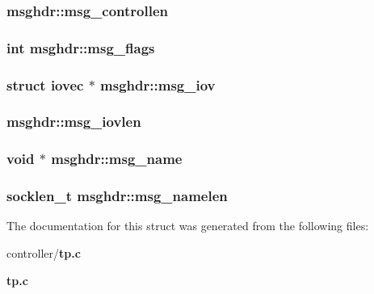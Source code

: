 \subsubsection[{msg\_\-controllen}]{ {\bf msghdr::msg\_\-controllen}}\label{structmsghdr_a9fa41b0e9a02b5dc9a01aa6f18108adb}
\subsubsection[{msg\_\-flags}]{\setlength{\rightskip}{0pt plus 5cm}int {\bf msghdr::msg\_\-flags}}\label{structmsghdr_a9e8ff97d402c99551cbfd564e9e10a74}
\subsubsection[{msg\_\-iov}]{\setlength{\rightskip}{0pt plus 5cm}struct {\bf iovec} $\ast$ {\bf msghdr::msg\_\-iov}}\label{structmsghdr_a10fcdab05a1eaaa283e8d7fe0518cc5e}
\subsubsection[{msg\_\-iovlen}]{ {\bf msghdr::msg\_\-iovlen}}\label{structmsghdr_ad4ef1bd6821e599bf42f936850d2c4d7}
\subsubsection[{msg\_\-name}]{\setlength{\rightskip}{0pt plus 5cm}void $\ast$ {\bf msghdr::msg\_\-name}}\label{structmsghdr_aa7d108bffe50b61a2079e10c984c1c10}
\subsubsection[{msg\_\-namelen}]{\setlength{\rightskip}{0pt plus 5cm}socklen\_\-t {\bf msghdr::msg\_\-namelen}}\label{structmsghdr_a47762b69eee1c9ba5736d64516ea0960}


The documentation for this struct was generated from the following files:\begin{DoxyCompactItemize}
\item 
controller/{\bf tp.c}\item 
{\bf tp.c}\end{DoxyCompactItemize}
